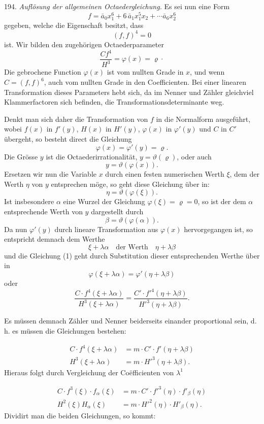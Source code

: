 \documentclass[11pt]{article}
\providecommand{\weberpage}[1]{}
\providecommand{\weq}[2]{\begin{equation}\tag{#1}#2\end{equation}}
\begin{document}
194. \textit{Auflösung der allgemeinen Octaedergleichung.} Es sei nun eine Form
\[
f=\bar a_0x_1^{6}+6\,\bar a_1x_1^{5}x_2+\cdots \bar a_6x_2^{6}
\]
gegeben, welche die Eigenschaft besitzt, dass
\[
(f,f)^4=0
\]
ist. Wir bilden den zugehörigen Octaederparameter
\[
\frac{Cf^4}{H^3}=\varphi(x)=\varrho\cdot
\]
Die gebrochene Function $\varphi(x)$ ist vom nullten Grade in $x$, und wenn $C=(f,f)^6$, auch vom nullten Grade in den Coefficienten. Bei einer linearen Transformation dieses Parameters hebt sich, da im Nenner und Zähler gleichviel Klammerfactoren sich befinden, die Transformationsdeterminante weg.

Denkt man sich daher die Transformation von $f$ in die Normalform ausgeführt, wobei $f(x)$ in $f'(y)$, $H(x)$ in $H'(y)$, $\varphi(x)$ in $\varphi'(y)$ und $C$ in $C'$ übergeht, so besteht direct die Gleichung
\weq{1}{\varphi(x)=\varphi'(y)=\varrho.}
Die Grösse $y$ ist die Octaederirrationalität, $y=\vartheta(\varrho)$, oder auch
\weq{2}{y=\vartheta(\varphi(x)).}
Ersetzen wir nun die Variable $x$ durch einen festen numerischen Werth $\xi$, dem der Werth $\eta$ von $y$ entsprechen möge, so geht diese Gleichung über in:
\weq{3}{\eta=\vartheta(\varphi(\xi)).}
Ist insbesondere $\alpha$ eine Wurzel der Gleichung $\varphi(\xi)=\varrho=0$, so ist der dem $\alpha$ entsprechende Werth von $y$ dargestellt durch
\weq{4}{\beta=\vartheta(\varphi(\alpha)).}
Da nun $\varphi'(y)$ durch lineare Transformation aus $\varphi(x)$ hervorgegangen ist, so entspricht demnach dem Werthe
\[
\xi+\lambda\alpha \quad \text{der Werth} \quad \eta+\lambda\beta
\]
und die Gleichung (1) geht durch Substitution dieser entsprechenden Werthe über in
\weq{5}{\varphi(\xi+\lambda\alpha)=\varphi'(\eta+\lambda\beta)}
oder
\[
\frac{C\cdot f^4(\xi+\lambda\alpha)}{H^3(\xi+\lambda\alpha)}=\frac{C'\cdot f'^4(\eta+\lambda\beta)}{H'^3(\eta+\lambda\beta)}.
\]


\weberpage{217}

Es müssen demnach Zähler und Nenner beiderseits einander proportional sein, d.\,h. es müssen die Gleichungen bestehen:

\[
\begin{aligned}
C\cdot f^4(\xi+\lambda\alpha) &= m\cdot C'\cdot f'(\eta+\lambda\beta)\\
H^3(\xi+\lambda\alpha) &= m\cdot H'^3(\eta+\lambda\beta).
\end{aligned}
\]
Hieraus folgt durch Vergleichung der Co\"efficienten von $\lambda^1$

\[
\begin{aligned}
C\cdot f^3(\xi)\cdot f_\alpha(\xi) &= m\cdot C'\cdot f'^3(\eta)\cdot f'_\beta(\eta)\\
H^2(\xi)H_\alpha(\xi) &= m\cdot H'^2(\eta)\cdot H'_\beta(\eta).
\end{aligned}
\]
Dividirt man die beiden Gleichungen, so kommt:
\end{document}
